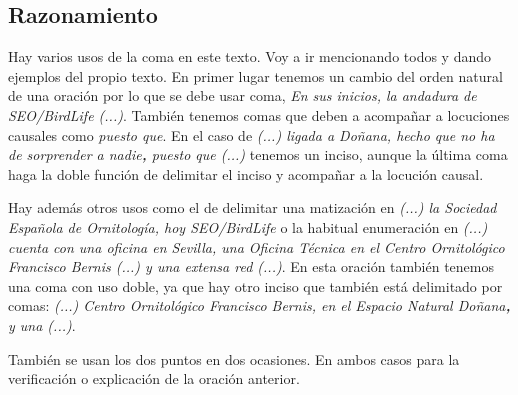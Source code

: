 \documentclass[12pt, a4paper, oneside]{report}
\begin{document}
        \subsection*{Razonamiento}
            Hay varios usos de la coma en este texto. Voy a ir mencionando todos y dando ejemplos del propio
            texto. En primer lugar tenemos un cambio del orden natural de una oración por lo que se debe usar
            coma, \textit{En sus inicios, la andadura de SEO/BirdLife (...)}. También tenemos comas que deben
            a acompañar a locuciones causales como \textit{puesto que}. En el caso de \textit{(...) ligada a
            Doñana, hecho que no ha de sorprender a nadie\color{verde}\textbf{,}\color{negro} \;puesto que
            (...)} tenemos un inciso, aunque la última coma haga la doble función de delimitar el inciso y
            acompañar a la locución causal.

            Hay además otros usos como el de delimitar una matización en
            \textit{(...) la Sociedad Española de Ornitología, hoy SEO/BirdLife} o la habitual enumeración en
            \textit{(...) cuenta con una oficina en Sevilla, una Oficina Técnica en el Centro Ornitológico
            Francisco Bernis (...) y una extensa red (...)}. En esta oración también tenemos una coma con uso
            doble, ya que hay otro inciso que también está delimitado por comas: \textit{ (...) Centro
            Ornitológico Francisco Bernis, en el Espacio Natural Doñana\color{verde}\textbf{,}\color{negro}
            \;y una (...)}.

            También se usan los dos puntos en dos ocasiones. En ambos casos para la verificación o explicación
            de la oración anterior.
\end{document}
